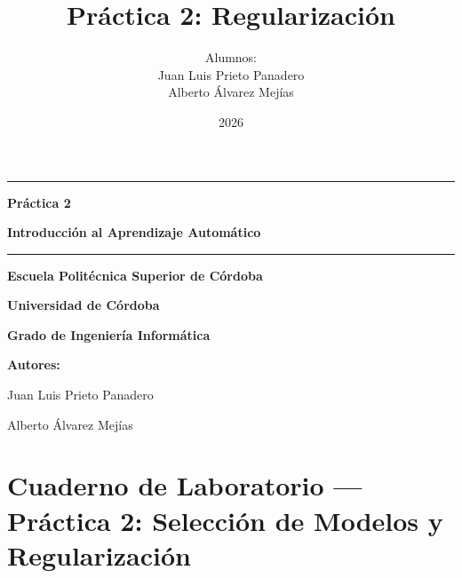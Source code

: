 \documentclass[12pt,oneside]{book}
\title{Práctica 2: Regularización}
\author{Alumnos:\\ 
Juan Luis Prieto Panadero\\
Alberto Álvarez Mejías}
\date{2026}
\begin{document}
\begin{titlepage}
\thispagestyle{empty}
\centering

\vspace*{0.5cm}
\noindent
\begin{minipage}[c]{0.45\textwidth}
    \raggedright
\end{minipage}
\begin{minipage}[c]{0.45\textwidth}
    \raggedleft
\end{minipage}

\vspace{0.9cm}
\rule{0.9\textwidth}{0.4pt}

\vspace{0.9cm}
{\LARGE\bfseries Práctica 2\par}
\vspace{0.25cm}
{\Large\bfseries Introducción al Aprendizaje Automático\par}

\vspace{0.9cm}
\rule{0.9\textwidth}{0.4pt}

\vspace{0.9cm}
{\large\bfseries Escuela Politécnica Superior de Córdoba\par}
\vspace{0.25cm}
{\large\bfseries Universidad de Córdoba\par}
\vspace{0.25cm}
{\large\bfseries Grado de Ingeniería Informática\par}

\vfill
{\large\bfseries Autores:\par}
\vspace{0.2cm}
{\normalsize Juan Luis Prieto Panadero\par}
{\normalsize Alberto Álvarez Mejías\par}

\vspace*{0.5cm}
\end{titlepage}

\clearpage
\setcounter{page}{1}

\chapter{Cuaderno de Laboratorio — Práctica 2: Selección de Modelos y Regularización}
\end{document}
